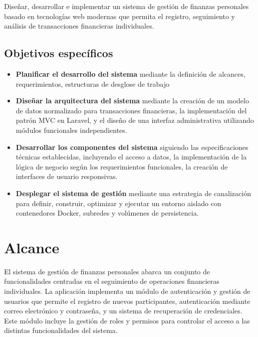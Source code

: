 \documentclass[journal]{IEEEtran}
\begin{document}
Diseñar, desarrollar e implementar un sistema de gestión de finanzas personales basado en tecnologías web modernas que permita el registro, seguimiento y análisis de transacciones financieras individuales.

\subsection{Objetivos específicos}

\begin{itemize}

  \item \textbf{Planificar el desarrollo del sistema} mediante la definición de alcances, requerimientos, estructuras de desglose de trabajo

  \item \textbf{Diseñar la arquitectura del sistema} mediante la creación de un modelo de datos normalizado para transacciones financieras, la implementación del patrón MVC en Laravel, y el diseño de una interfaz administrativa utilizando módulos funcionales independientes.

  \item \textbf{Desarrollar los componentes del sistema} siguiendo las especificaciones técnicas establecidas, incluyendo el acceso a datos, la implementación de la lógica de negocio según los requerimientos funcionales, la creación de interfaces de usuario responsivas.

  \item \textbf{Desplegar el sistema de gestión} mediante una estrategia de canalización para definir, construir, optimizar y ejecutar un entorno aislado con contenedores Docker, subredes y volúmenes de persistencia.
\end{itemize}

\section{Alcance}

El sistema de gestión de finanzas personales abarca un conjunto de funcionalidades centradas en el seguimiento de operaciones financieras individuales. La aplicación implementa un módulo de autenticación y gestión de usuarios que permite el registro de nuevos participantes, autenticación mediante correo electrónico y contraseña, y un sistema de recuperación de credenciales. Este módulo incluye la gestión de roles y permisos para controlar el acceso a las distintas funcionalidades del sistema.
\end{document}
